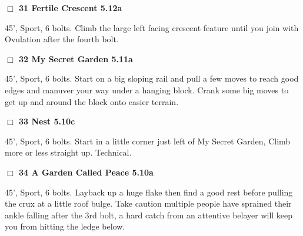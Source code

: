 \begin{multicols}{2}
\needspace{2em}
\label{rt:Fertile Crescent}
\colorbox{Goldenrod!20}{
\parbox{0.95\linewidth}{
\hspace{-1ex}\textbf{$\Box$
31 Fertile Crescent 5.12a  
}}}
\begin{adjustwidth}{1.3em}{}			

45', Sport, 6 bolts. Climb the large left facing crescent feature until you join with Ovulation after the fourth bolt.
\end{adjustwidth}




\needspace{2em}
\label{rt:My Secret Garden}
\colorbox{RoyalBlue!20}{
\parbox{0.95\linewidth}{
\hspace{-1ex}\textbf{$\Box$
32 My Secret Garden 5.11a  
}}}
\begin{adjustwidth}{1.3em}{}			

45', Sport, 6 bolts. Start on a big sloping rail and pull a few moves to reach good edges and manuver your way under a hanging block. Crank some big moves to get up and around the block onto easier terrain.
\end{adjustwidth}




\needspace{2em}
\label{rt:Nest}
\colorbox{RoyalBlue!20}{
\parbox{0.95\linewidth}{
\hspace{-1ex}\textbf{$\Box$
33 Nest 5.10c  
}}}
\begin{adjustwidth}{1.3em}{}			

45', Sport, 6 bolts. Start in a little corner just left of My Secret Garden, Climb more or less straight up. Technical.
\end{adjustwidth}




\needspace{2em}
\label{rt:A Garden Called Peace}
\colorbox{RoyalBlue!20}{
\parbox{0.95\linewidth}{
\hspace{-1ex}\textbf{$\Box$
34 A Garden Called Peace 5.10a  
}}}
\begin{adjustwidth}{1.3em}{}			

45', Sport, 6 bolts. Layback up a huge flake then find a good rest before pulling the crux at a little roof bulge. Take caution multiple people have sprained their ankle falling after the 3rd bolt, a hard catch from an attentive belayer will keep you from hitting the ledge below.
\end{adjustwidth}





\end{multicols}
